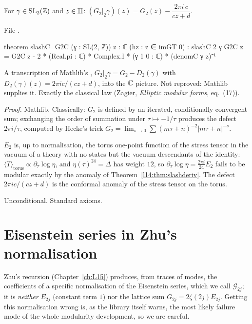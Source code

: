 \begin{theorem}\label{l14:thm:G2slash}
For $\gamma\in\mathrm{SL}_2(\mathbb{Z})$ and $z\in\mathbb{H}$: $(G_2|_2\gamma)(z) = G_2(z) - \dfrac{2\pi i\,c}{cz+d}$.
\end{theorem}
\noindent File .
\begin{leancode}
theorem slashC_G2C (γ : SL(2, ℤ)) {z : ℂ} (hz : z ∈ imGT 0) :
    slashC 2 γ G2C z
      = G2C z - 2 * (Real.pi : ℂ) * Complex.I * (γ 1 0 : ℂ) * (denomC γ z)⁻¹
\end{leancode}
\begin{dictionary}
A transcription of Mathlib's , $G_2|_2\gamma = G_2 - D_2(\gamma)$ with
$D_2(\gamma)(z) = 2\pi i c/(cz+d)$, into the ${\mathbb{C}}$ picture. Not reproved: Mathlib supplies it. Exactly the classical law
(Zagier, \emph{Elliptic modular forms}, eq.~(17)).
\end{dictionary}
\noindent\emph{Proof.} Mathlib. Classically: $G_2$ is defined by an iterated, conditionally convergent sum; exchanging the
order of summation under $\tau\mapsto-1/\tau$ produces the defect $2\pi i/\tau$, computed by Hecke's trick
$G_2 = \lim_{s\to0}\sum(m\tau+n)^{-2}|m\tau+n|^{-s}$.
\begin{physics}
$E_2$ is, up to normalisation, the torus one-point function of the stress tensor in the vacuum of a theory with no
states but the vacuum descendants of the identity: $\langle T\rangle_{\text{torus}}\propto\partial_\tau\log\eta$, and
$\eta(\tau)^{24}=\Delta$ has weight $12$, so $\partial_\tau\log\eta = \frac{2\pi i}{24}E_2$ fails to be modular exactly by
the anomaly of Theorem~\ref{l14:thm:slashderiv}. The defect $2\pi ic/(cz+d)$ is the conformal anomaly of the stress tensor
on the torus.
\end{physics}
\begin{status}
Unconditional. Standard axioms.
\end{status}

\section{Eisenstein series in Zhu's normalisation}\label{l14:sec:eis}

Zhu's recursion (Chapter~\ref{ch:L15}) produces, from traces of modes, the coefficients of a specific normalisation of the
Eisenstein series, which we call $\mathcal G_{2j}$; it is \emph{neither} $E_{2j}$ (constant term $1$) nor the lattice sum
$G_{2j} = 2\zeta(2j)E_{2j}$. Getting this normalisation wrong is, as the library itself warns, the most likely failure mode
of the whole modularity development, so we are careful.

